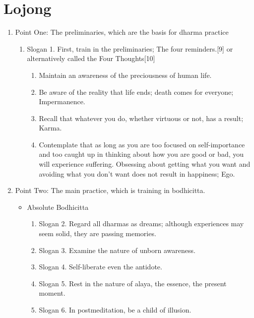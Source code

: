 \section{Lojong}
\begin{enumerate}%
  \item Point One: The preliminaries, which are the basis for dharma practice
    \begin{enumerate}

        \item Slogan 1. First, train in the preliminaries; The four reminders.[9] or alternatively called the Four Thoughts[10]
          \begin{enumerate}

            \item Maintain an awareness of the preciousness of human life.
            \item Be aware of the reality that life ends; death comes for everyone; Impermanence.
            \item Recall that whatever you do, whether virtuous or not, has a result; Karma.
            \item Contemplate that as long as you are too focused on self-importance and too caught up in thinking about how you are good or bad, you will experience suffering. Obsessing about getting what you want and avoiding what you don't want does not result in happiness; Ego.
      \end{enumerate}
    \end{enumerate}

    \item Point Two: The main practice, which is training in bodhicitta.
      \begin{itemize}
        \item Absolute Bodhicitta
          \begin{enumerate}
            \item Slogan 2. Regard all dharmas as dreams; although experiences may seem solid, they are passing memories.
            \item Slogan 3. Examine the nature of unborn awareness.
            \item Slogan 4. Self-liberate even the antidote.
            \item Slogan 5. Rest in the nature of alaya, the essence, the present moment.
            \item Slogan 6. In postmeditation, be a child of illusion.
          \end{enumerate}
      

\end{itemize}
\end{enumerate}
